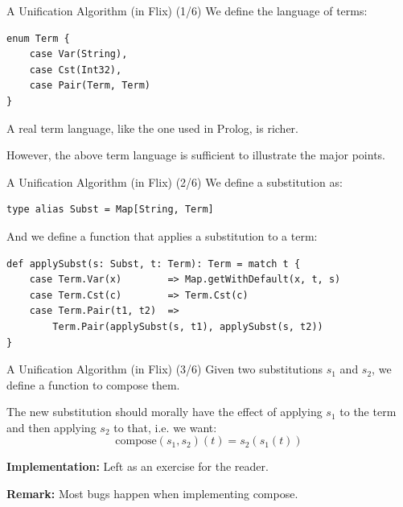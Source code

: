 \begin{frame}[fragile]{A Unification Algorithm (in Flix) (1/6)}
We define the language of terms:

\begin{lstlisting}[language=flix, xleftmargin=0.5cm]
enum Term {
    case Var(String),
    case Cst(Int32),
    case Pair(Term, Term)
}
\end{lstlisting}

A real term language, like the one used in Prolog, is richer.

However, the above term language is sufficient to illustrate the major points. 
\end{frame}

\begin{frame}[fragile]{A Unification Algorithm (in Flix) (2/6)}
We define a substitution as:

\begin{lstlisting}[language=flix, xleftmargin=0.5cm]
type alias Subst = Map[String, Term]
\end{lstlisting}

\pause

And we define a function that applies a substitution to a term:

\begin{lstlisting}[language=flix, xleftmargin=0.5cm]
def applySubst(s: Subst, t: Term): Term = match t {
    case Term.Var(x)        => Map.getWithDefault(x, t, s)
    case Term.Cst(c)        => Term.Cst(c)
    case Term.Pair(t1, t2)  => 
        Term.Pair(applySubst(s, t1), applySubst(s, t2))
}
\end{lstlisting}
\end{frame}

\begin{frame}[fragile]{A Unification Algorithm (in Flix) (3/6)}
Given two substitutions $s_1$ and $s_2$, we define a function to compose them.

The new substitution should morally have the effect of applying $s_1$ to the
term and then applying $s_2$ to that, i.e. we want:
%
\[
    \text{compose}(s_1, s_2)(t) = s_2(s_1(t))
\]

\textbf{Implementation:} Left as an exercise for the reader.

\textbf{Remark:} Most bugs happen when implementing compose. 
\end{frame}

